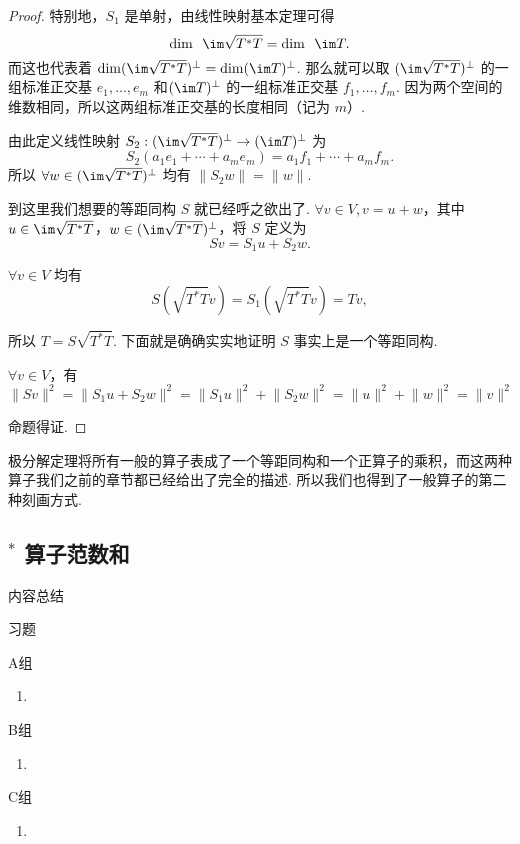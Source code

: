 \begin{proof}
    特别地，$ S_1 $ 是单射，由线性映射基本定理可得
    \[ \dim \enspace \im \sqrt{T^*T} = \dim \enspace \im T. \]
    而这也代表着 $ \dim(\im \sqrt{T^*T})^{\perp} = \dim(\im T)^{\perp} $. 那么就可以取 $ (\im \sqrt{T^*T})^{\perp} $ 的一组标准正交基 $ e_1, \ldots , e_m $ 和$ (\im T)^{\perp} $ 的一组标准正交基 $ f_1, \ldots, f_m $. 因为两个空间的维数相同，所以这两组标准正交基的长度相同（记为 $ m $）.

    由此定义线性映射 $ S_2: (\im \sqrt{T^*T})^{\perp} \rightarrow (\im T)^{\perp} $ 为
    \[ S_2(a_1e_1 + \cdots + a_me_m) = a_1f_1 + \cdots + a_mf_m. \]
    所以 $ \forall w \in (\im \sqrt{T^*T})^{\perp} $ 均有 $ \lVert S_2w \rVert = \lVert w \rVert $.

    到这里我们想要的等距同构 $ S $ 就已经呼之欲出了. $ \forall v \in V, v = u + w $，其中 $ u \in \im \sqrt{T^*T} $，$ w \in (\im \sqrt{T^*T})^{\perp} $，将 $ S $ 定义为
    \[ Sv = S_1u + S_2w. \]

    $ \forall v \in V $ 均有
    \[ S(\sqrt{T^*T}v) = S_1(\sqrt{T^*T}v) = Tv, \]

    所以 $ T = S\sqrt{T^*T} $. 下面就是确确实实地证明 $ S $ 事实上是一个等距同构.

    $ \forall v \in V $，有
    \[ \lVert Sv \rVert^2 = \lVert S_1u + S_2w \rVert^2     = \lVert S_1u \rVert^2 + \lVert S_2w \rVert^2 = \lVert u \rVert^2 + \lVert w \rVert^2 = \lVert v \rVert^2 \]

    命题得证.
\end{proof}

极分解定理将所有一般的算子表成了一个等距同构和一个正算子的乘积，而这两种算子我们之前的章节都已经给出了完全的描述. 所以我们也得到了一般算子的第二种刻画方式.

\subsection*{$^*$ 算子范数和}

\vspace{2ex}
\centerline{\heiti \Large 内容总结}

\vspace{2ex}
\centerline{\heiti \Large 习题}

\vspace{2ex}
{\kaishu }
\begin{flushright}
    \kaishu

\end{flushright}

\centerline{\heiti A组}
\begin{enumerate}
    \item
\end{enumerate}

\centerline{\heiti B组}
\begin{enumerate}
    \item
\end{enumerate}

\centerline{\heiti C组}
\begin{enumerate}
    \item
\end{enumerate}
